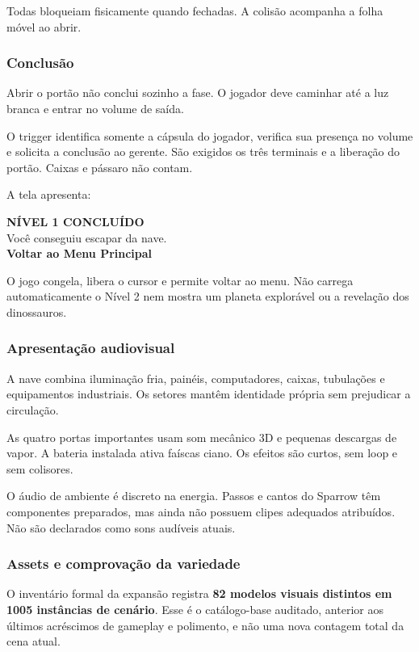 \documentclass[12pt,a4paper]{article}
\begin{document}
Todas bloqueiam fisicamente quando fechadas. A colisão acompanha a
folha móvel ao abrir.

\subsubsection*{Conclusão}

Abrir o portão não conclui sozinho a fase. O jogador deve caminhar
até a luz branca e entrar no volume de saída.

O trigger identifica somente a cápsula do jogador, verifica sua
presença no volume e solicita a conclusão ao gerente. São exigidos
os três terminais e a liberação do portão. Caixas e pássaro não contam.

A tela apresenta:

\begin{center}
\textbf{NÍVEL 1 CONCLUÍDO}\\[0.15cm]
Você conseguiu escapar da nave.\\[0.15cm]
\textbf{Voltar ao Menu Principal}
\end{center}

O jogo congela, libera o cursor e permite voltar ao menu.
Não carrega automaticamente o Nível 2 nem mostra um planeta
explorável ou a revelação dos dinossauros.

\subsubsection*{Apresentação audiovisual}

A nave combina iluminação fria, painéis, computadores, caixas,
tubulações e equipamentos industriais. Os setores mantêm identidade
própria sem prejudicar a circulação.

As quatro portas importantes usam som mecânico 3D e pequenas
descargas de vapor. A bateria instalada ativa faíscas ciano.
Os efeitos são curtos, sem loop e sem colisores.

O áudio de ambiente é discreto na energia. Passos e cantos do
Sparrow têm componentes preparados, mas ainda não possuem clipes
adequados atribuídos. Não são declarados como sons audíveis atuais.

\subsubsection*{Assets e comprovação da variedade}

O inventário formal da expansão registra \textbf{82 modelos visuais
distintos em 1005 instâncias de cenário}. Esse é o catálogo-base
auditado, anterior aos últimos acréscimos de gameplay e polimento,
e não uma nova contagem total da cena atual.
\end{document}
